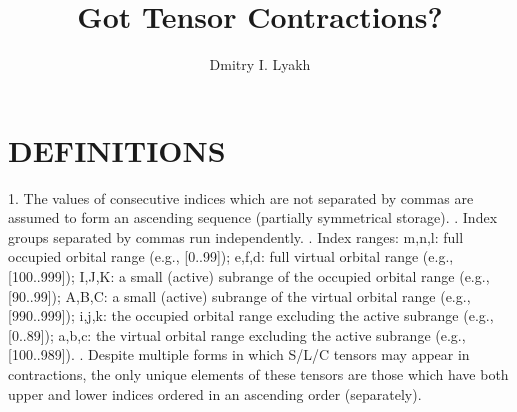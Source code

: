 \documentclass[letterpaper,10pt,fleqn,leqno,onecolumn]{article}
\title{Got Tensor Contractions?}
\author{Dmitry I. Lyakh}
\begin{document}
\maketitle
\section{DEFINITIONS}
 1. The values of consecutive indices which are not separated by commas
    are assumed to form an ascending sequence (partially symmetrical storage). . Index groups separated by commas run independently. . Index ranges: \newline
    m,n,l: full occupied orbital range (e.g., [0..99]); \newline
    e,f,d: full virtual orbital range (e.g., [100..999]); \newline
    I,J,K: a small (active) subrange of the occupied orbital range (e.g., [90..99]); \newline
    A,B,C: a small (active) subrange of the virtual orbital range (e.g., [990..999]); \newline
    i,j,k: the occupied orbital range excluding the active subrange (e.g., [0..89]); \newline
    a,b,c: the virtual orbital range excluding the active subrange (e.g., [100..989]). . Despite multiple forms in which S/L/C tensors may appear in contractions,
    the only unique elements of these tensors are those which have both upper
    and lower indices ordered in an ascending order (separately). \newline
\end{document}
